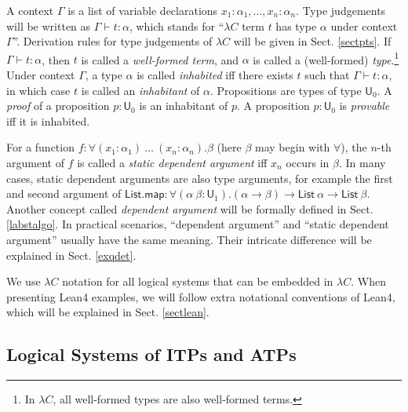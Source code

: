   A context $\Gamma$ is a list of variable declarations $x_1 : \alpha_1, \dots, x_n : \alpha_n$.
  Type judgements will be written as $\Gamma \vdash t : \alpha$, which stands for ``$\lambda C$ term $t$
  has type $\alpha$ under context $\Gamma$''. Derivation rules for type judgements of
  $\lambda C$ will be given in Sect. \ref{sectpts}. If $\Gamma \vdash t : \alpha$, then $t$ is
  called a \textit{well-formed term}, and $\alpha$ is called a (well-formed)
  \textit{type}.\footnote{In $\lambda C$, all well-formed types are also well-formed terms.}
  Under context $\Gamma$, a type $\alpha$ is called \textit{inhabited} iff there exists $t$ such
  that $\Gamma \vdash t : \alpha$, in which case $t$ is called an \textit{inhabitant} of $\alpha$.
  Propositions are types of type $\mathsf{U}_0$. A \textit{proof} of a proposition
  $p : \mathsf{U}_0$ is an inhabitant of $p$. A proposition $p : \mathsf{U}_0$ is \textit{provable}
  iff it is inhabited.

  For a function $f : \forall (x_1 : \alpha_1) \ \dots \ (x_n : \alpha_n). \beta$ (here $\beta$ may begin with $\forall$),
  the $n$-th argument of $f$ is called a \textit{static dependent argument} iff $x_n$ occurs in $\beta$.
  In many cases, static dependent arguments are also type arguments, for example the first and second argument
  of $\mathsf{List.map} : \forall (\alpha \ \beta : \mathsf{U}_1). (\alpha \to \beta) \to \mathsf{List} \ \alpha \to \mathsf{List} \ \beta$.
  Another concept called \textit{dependent argument} will be formally defined in
  Sect. \ref{labstalgo}. In practical scenarios, ``dependent argument'' and ``static dependent argument'' usually
  have the same meaning. Their intricate difference will be explained in Sect. \ref{exqdet}.

  We use $\lambda C$ notation for all logical systems that can be embedded in $\lambda C$.
  When presenting Lean4 examples, we will follow extra notational conventions
  of Lean4, which will be explained in Sect. \ref{sectlean}.

\subsection{Logical Systems of ITPs and ATPs}\label{sublogsys}

